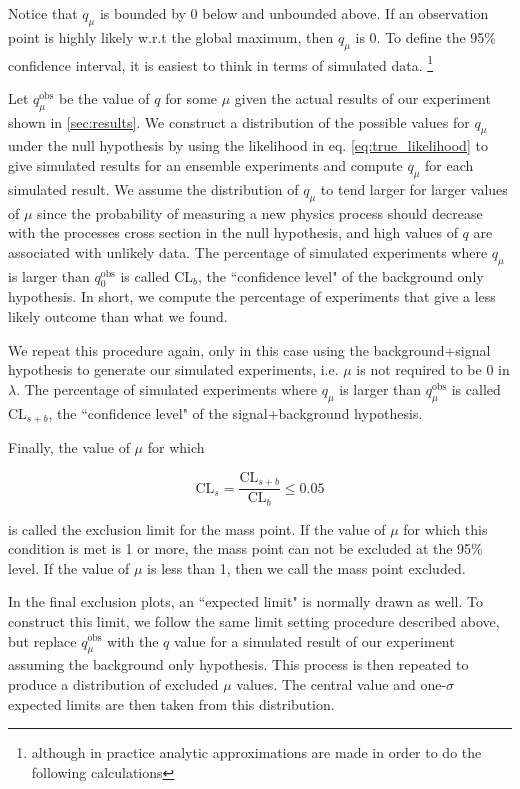        Notice that $q_\mu$ is bounded by 0 below and unbounded above. If an observation point is highly likely w.r.t the global maximum, then $q_\mu$ is 0. To define the 95\% confidence interval, it is easiest to think in terms of simulated data. \footnote{ although in practice analytic approximations are made in order to do the following calculations} 

       Let $q^\text{obs}_\mu$ be the value of $q$ for some $\mu$ given the actual results of our experiment shown in \ref{sec:results}. We construct a distribution of the possible values for $q_\mu$ under the null hypothesis by using the likelihood in eq. \ref{eq:true_likelihood} to give simulated results for an ensemble experiments and compute $q_\mu$ for each simulated result. We assume the distribution of $q_\mu$ to tend larger for larger values of $\mu$ since the probability of measuring a new physics process should decrease with the processes cross section in the null hypothesis, and high values of $q$ are associated with unlikely data. The percentage of simulated experiments where $q_\mu$ is larger than $q^\text{obs}_0$ is called CL$_b$, the ``confidence level" of the background only hypothesis. In short, we compute the percentage of experiments that give a less likely outcome than what we found. 

       We repeat this procedure again, only in this case using the background+signal hypothesis to generate our simulated experiments, i.e. $\mu$ is not required to be 0 in $\lambda$. The percentage of simulated experiments where $q_\mu$ is larger than $q^\text{obs}_\mu$ is called CL$_{s+b}$, the ``confidence level" of the signal+background hypothesis. 

       Finally, the value of $\mu$ for which 

       \[
        \text{CL}_s = \frac{\text{CL}_{s+b}}{\text{CL}_b} \le 0.05
       \]

       is called the exclusion limit for the mass point. If the value of $\mu$ for which this condition is met is 1 or more, the mass point can not be excluded at the 95\% level. If the value of $\mu$ is less than 1, then we call the mass point excluded.

       In the final exclusion plots, an ``expected limit" is normally drawn as well. To construct this limit, we follow the same limit setting procedure described above, but replace $q^\text{obs}_\mu$ with the $q$ value for a simulated result of our experiment assuming the background only hypothesis. This process is then repeated to produce a distribution of excluded $\mu$ values. The central value and one-$\sigma$ expected limits are then taken from this distribution.

